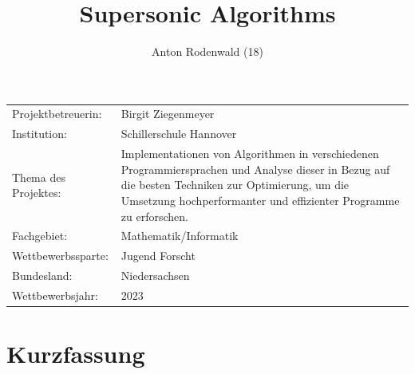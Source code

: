 \documentclass[11pt,a4paper]{article}
\begin{document}
\addtocounter{page}{-1}


\title{Supersonic Algorithms}
\author{Anton Rodenwald (18)}

\maketitle

\thispagestyle{empty}

\large\begin{tabular}{l p{12cm}}

    Projektbetreuerin: & Birgit Ziegenmeyer                                                    \\

    Institution:       & Schillerschule Hannover                                               \\

    Thema des Projektes:
                       & Implementationen von Algorithmen in verschiedenen Programmiersprachen
    und Analyse dieser in Bezug auf die besten Techniken zur Optimierung,
    um die Umsetzung hochperformanter und effizienter Programme zu erforschen.                 \\

    Fachgebiet:        & Mathematik/Informatik                                                 \\

    Wettbewerbssparte: & Jugend Forscht                                                        \\

    Bundesland:        & Niedersachsen                                                         \\

    Wettbewerbsjahr:   & 2023                                                                  \\
\end{tabular}


\clearpage


\section*{Kurzfassung}
\end{document}

